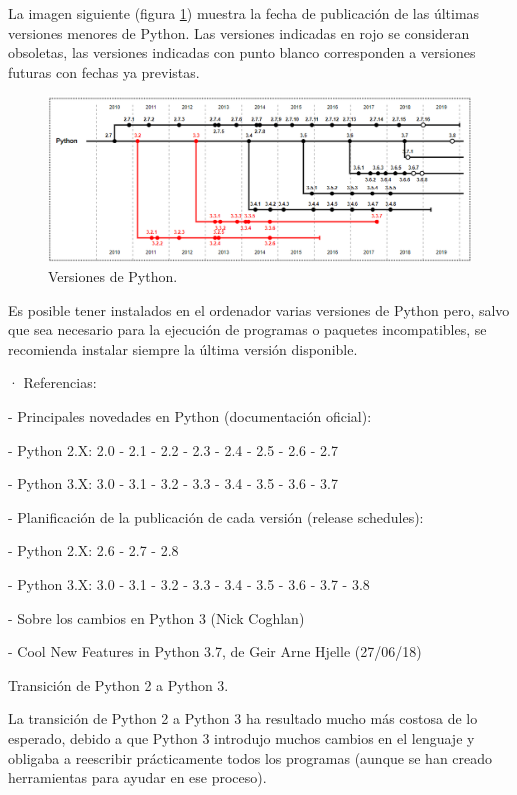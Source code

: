 La imagen siguiente (figura \ref{fig:FotosPaginasWebHeliostatos/unnamed(8).png}) muestra la fecha de publicación de las últimas versiones menores de Python. Las versiones indicadas en rojo se consideran obsoletas, las versiones indicadas con punto blanco corresponden a versiones futuras con fechas ya previstas.

\begin{figure}[h!]
  	\centering
	\includegraphics[width=\textwidth]{FotosPaginasWebHeliostatos/unnamed(8).png}
	\caption{Versiones de Python.
	\label{fig:FotosPaginasWebHeliostatos/unnamed(8).png}}
\end{figure}

Es posible tener instalados en el ordenador varias versiones de Python pero, salvo que sea necesario para la ejecución de programas o paquetes incompatibles, se recomienda instalar siempre la última versión disponible.

· Referencias:

- Principales novedades en Python (documentación oficial):

- Python 2.X: 2.0 - 2.1 - 2.2 - 2.3 - 2.4 - 2.5 - 2.6 - 2.7

- Python 3.X: 3.0 - 3.1 - 3.2 - 3.3 - 3.4 - 3.5 - 3.6 - 3.7

- Planificación de la publicación de cada versión (release schedules):

- Python 2.X: 2.6 - 2.7 - 2.8

- Python 3.X: 3.0 - 3.1 - 3.2 - 3.3 - 3.4 - 3.5 - 3.6 - 3.7 - 3.8

- Sobre los cambios en Python 3 (Nick Coghlan)

- Cool New Features in Python 3.7, de Geir Arne Hjelle (27/06/18)

Transición de Python 2 a Python 3.

La transición de Python 2 a Python 3 ha resultado mucho más costosa de lo esperado, debido a que Python 3 introdujo muchos cambios en el lenguaje y obligaba a reescribir prácticamente todos los programas (aunque se han creado herramientas para ayudar en ese proceso).

